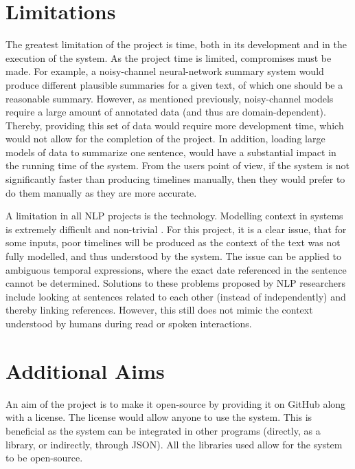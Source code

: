 \section{Limitations}
\par The greatest limitation of the project is time, both in its development and in the execution of the system. As the project time is limited, compromises must be made. For example, a noisy-channel neural-network summary system would produce different plausible summaries for a given text, of which one should be a reasonable summary. However, as mentioned previously, noisy-channel models require a large amount of annotated data (and thus are domain-dependent). Thereby, providing this set of data would require more development time, which would not allow for the completion of the project. In addition, loading large models of data to summarize one sentence, would have a substantial impact in the running time of the system. From the users point of view, if the system is not significantly faster than producing timelines manually, then they would prefer to do them manually as they are more accurate.

\par A limitation in all NLP projects is the technology. Modelling context in systems is extremely difficult and non-trivial \cite{iwanskazadrozny1997}. For this project, it is a clear issue, that for some inputs, poor timelines will be produced as the context of the text was not fully modelled, and thus understood by the system. The issue can be applied to ambiguous temporal expressions, where the exact date referenced in the sentence cannot be determined. Solutions to these problems proposed by NLP researchers include looking at sentences related to each other (instead of independently) and thereby linking references. However, this still does not mimic the context understood by humans during read or spoken interactions.

\section{Additional Aims} 
\par An aim of the project is to make it open-source by providing it on GitHub along with a license. The license would allow anyone to use the system. This is beneficial as the system can be integrated in other programs (directly, as a library, or indirectly, through JSON). All the libraries used allow for the system to be open-source.

